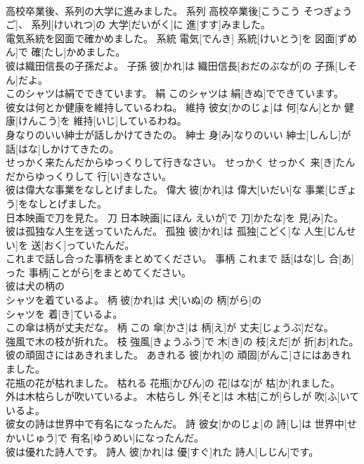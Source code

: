 \documentclass[8pt]{extreport}
\begin{document}
\begin{CJK}{UTF8}{min}
\\	高校卒業後、系列の大学に進みました。	系列	高校卒業後[こうこう そつぎょう ご]、 系列[けいれつ]の 大学[だいがく]に 進[すす]みました。	
\\	電気系統を図面で確かめました。	系統	電気[でんき] 系統[けいとう]を 図面[ずめん]で 確[たし]かめました。	
\\	彼は織田信長の子孫だよ。	子孫	彼[かれ]は 織田信長[おだのぶなが]の 子孫[しそん]だよ。	
\\	このシャツは絹でできています。	絹	このシャツは 絹[きぬ]でできています。	
\\	彼女は何とか健康を維持しているわね。	維持	彼女[かのじょ]は 何[なん]とか 健康[けんこう]を 維持[いじ]しているわね。	
\\	身なりのいい紳士が話しかけてきたの。	紳士	身[み]なりのいい 紳士[しんし]が 話[はな]しかけてきたの。	
\\	せっかく来たんだからゆっくりして行きなさい。	せっかく	せっかく 来[き]たんだからゆっくりして 行[い]きなさい。	
\\	彼は偉大な事業をなしとげました。	偉大	彼[かれ]は 偉大[いだい]な 事業[じぎょう]をなしとげました。	
\\	日本映画で刀を見た。	刀	日本映画[にほん えいが]で 刀[かたな]を 見[み]た。	
\\	彼は孤独な人生を送っていたんだ。	孤独	彼[かれ]は 孤独[こどく]な 人生[じんせい]を 送[おく]っていたんだ。	
\\	これまで話し合った事柄をまとめてください。	事柄	これまで 話[はな]し 合[あ]った 事柄[ことがら]をまとめてください。	
\\	彼は犬の柄の
\\	シャツを着ているよ。	柄	彼[かれ]は 犬[いぬ]の 柄[がら]の
\\	シャツを 着[き]ているよ。	
\\	この傘は柄が丈夫だな。	柄	この 傘[かさ]は 柄[え]が 丈夫[じょうぶ]だな。	
\\	強風で木の枝が折れた。	枝	強風[きょうふう]で 木[き]の 枝[えだ]が 折[お]れた。	
\\	彼の頑固さにはあきれました。	あきれる	彼[かれ]の 頑固[がんこ]さにはあきれました。	
\\	花瓶の花が枯れました。	枯れる	花瓶[かびん]の 花[はな]が 枯[か]れました。	
\\	外は木枯らしが吹いているよ。	木枯らし	外[そと]は 木枯[こが]らしが 吹[ふ]いているよ。	
\\	彼女の詩は世界中で有名になったんだ。	詩	彼女[かのじょ]の 詩[し]は 世界中[せかいじゅう]で 有名[ゆうめい]になったんだ。	
\\	彼は優れた詩人です。	詩人	彼[かれ]は 優[すぐ]れた 詩人[しじん]です。	

\end{CJK}
\end{document}
